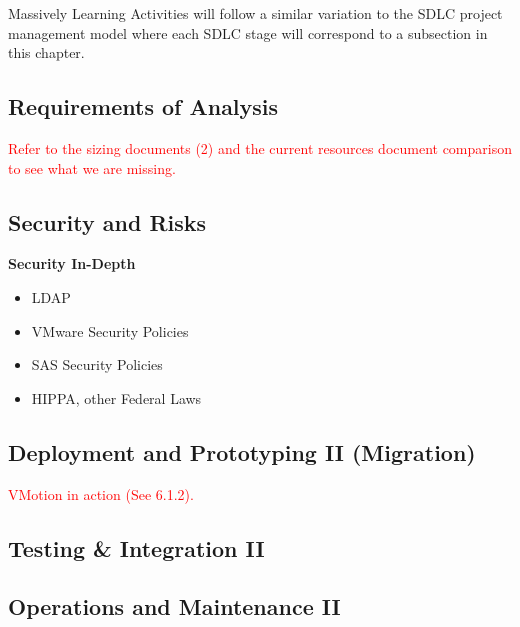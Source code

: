 Massively Learning Activities will follow a similar variation to the SDLC project management model where each SDLC stage will correspond to a subsection in this chapter. 

\subsection{Requirements of Analysis}
\textcolor{red}{Refer to the sizing documents (2) and the current resources document comparison to see what we are missing.}

\subsection{Security and Risks}
\textbf{Security In-Depth}
\begin{itemize}
    \item LDAP
    \item VMware Security Policies
    \item SAS Security Policies
    \item HIPPA, other Federal Laws
\end{itemize}

\subsection{Deployment and Prototyping II (Migration)}

\textcolor{red}{VMotion in action (See 6.1.2).}

\subsection{Testing \& Integration II}

\subsection{Operations and Maintenance II}

